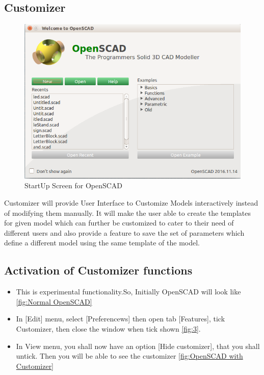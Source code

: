 \documentclass[12pt,includeheadfoot,a4paper]{report}
\begin{document}
\subsection{Customizer}

\begin{figure}
	\centering \includegraphics[scale=0.60]{images/output/1.png}
	\caption{StartUp Screen for OpenSCAD}
	\label{fig:1}
\end{figure}

Customizer  will provide User Interface to Customize Models interactively instead of modifying them manually. It will make the user able to create the templates for given model which can further be customized to cater to their need of different users and also provide a feature to save the set of parameters which define a different model using the same template of the model.
\subsection{Activation of Customizer functions}
\begin{itemize}
	
	\item This is experimental functionality.So, Initially
	OpenSCAD will look like \ref{fig:Normal OpenSCAD}
	\item In [Edit] menu, select [Preferencews] then open tab [Features], tick Customizer, then close the window when tick shown \ref{fig:3}.
	\item In View menu, you shall now have an option [Hide customizer], that you shall untick. Then you will be able to see the customizer \ref{fig:OpenSCAD with Customizer}
	
\end{itemize}
\end{document}
